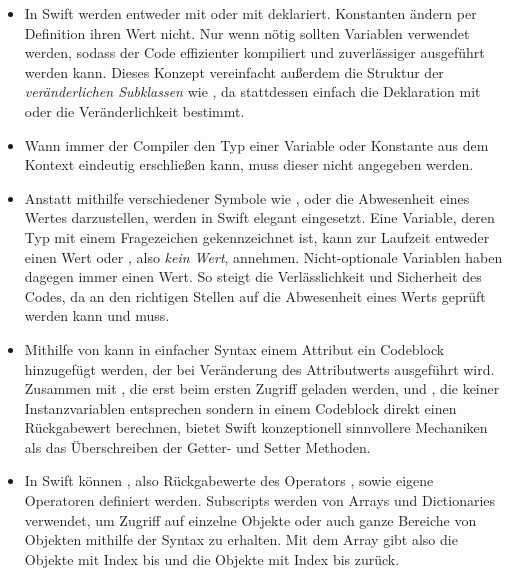\documentclass[parskip=half, final]{scrreprt}
\begin{document}
\begin{itemize}
\item In Swift werden entweder  mit  oder  mit  deklariert. Konstanten ändern per Definition ihren Wert nicht. Nur wenn nötig sollten Variablen verwendet werden, sodass der Code effizienter kompiliert und zuverlässiger ausgeführt werden kann. Dieses Konzept vereinfacht außerdem die Struktur der \emph{veränderlichen Subklassen} wie , da stattdessen einfach die Deklaration mit  oder  die Veränderlichkeit bestimmt.
\item {} Wann immer der Compiler den Typ einer Variable oder Konstante aus dem Kontext eindeutig erschließen kann, muss dieser nicht angegeben werden.
\item Anstatt mithilfe verschiedener Symbole wie ,  oder  die Abwesenheit eines Wertes darzustellen, werden in Swift elegant  eingesetzt. Eine Variable, deren Typ mit einem Fragezeichen gekennzeichnet ist, kann zur Laufzeit entweder einen Wert oder , also \emph{kein Wert}, annehmen. Nicht-optionale Variablen haben dagegen immer einen Wert. So steigt die Verlässlichkeit und Sicherheit des Codes, da an den richtigen Stellen auf die Abwesenheit eines Werts geprüft werden kann und muss.
\item Mithilfe von  kann in einfacher Syntax einem  Attribut ein Codeblock hinzugefügt werden, der bei Veränderung des Attributwerts ausgeführt wird. Zusammen mit , die erst beim ersten Zugriff geladen werden, und , die keiner Instanzvariablen entsprechen sondern in einem Codeblock direkt einen Rückgabewert berechnen, bietet Swift konzeptionell sinnvollere Mechaniken als das Überschreiben der Getter- und Setter Methoden.
\item In Swift können , also Rückgabewerte des Operators \swift{[]}, sowie eigene Operatoren definiert werden. Subscripts werden von Arrays und Dictionaries verwendet, um Zugriff auf einzelne Objekte oder auch ganze Bereiche von Objekten mithilfe der  Syntax zu erhalten. Mit dem Array  gibt also  die Objekte mit Index  bis  und  die Objekte mit Index  bis  zurück.

\end{itemize}
\end{document}
